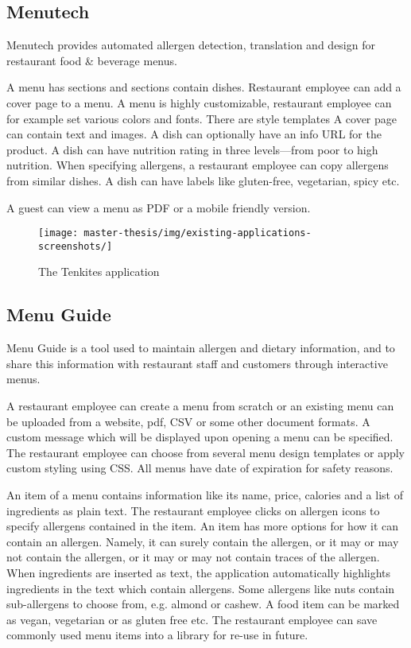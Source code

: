 \newpage

\subsection*{Menutech}
  Menutech provides automated allergen detection, translation and design for restaurant food & beverage menus.
  
  A menu has sections and sections contain dishes.
  Restaurant employee can add a cover page to a menu.
  A menu is highly customizable, restaurant employee can for example set various colors and fonts.
  There are style templates
  A cover page can contain text and images.
  A dish can optionally have an info URL for the product.
  A dish can have nutrition rating in three levels---from poor to high nutrition.
  When specifying allergens, a restaurant employee can copy allergens from similar dishes.
  A dish can have labels like gluten-free, vegetarian, spicy etc.

  A guest can view a menu as PDF or a mobile friendly version.

  \begin{figure}[h]
    \centering
    \texttt{[image: master-thesis/img/existing-applications-screenshots/]}
    \caption{The Tenkites application}
  \end{figure}

\subsection*{Menu Guide}
  Menu Guide is a tool used to maintain allergen and dietary information, and to share this information with restaurant staff and customers through interactive menus.

  A restaurant employee can create a menu from scratch or an existing menu can be uploaded from a website, pdf, CSV or some other document formats. 
  A custom message which will be displayed upon opening a menu can be specified.
  The restaurant employee can choose from several menu design templates or apply custom styling using CSS.
  All menus have date of expiration for safety reasons.

  An item of a menu contains information like its name, price, calories and a list of ingredients as plain text.
  The restaurant employee clicks on allergen icons to specify allergens contained in the item.
  An item has more options for how it can contain an allergen. 
  Namely, it can surely contain the allergen, or it may or may not contain the allergen, or it may or may not contain traces of the allergen.
  When ingredients are inserted as text, the application automatically highlights ingredients in the text which contain allergens.
  Some allergens like nuts contain sub-allergens to choose from, e.g. almond or cashew.
  A food item can be marked as vegan, vegetarian or as gluten free etc.
  The restaurant employee can save commonly used menu items into a library for re-use in future. 

